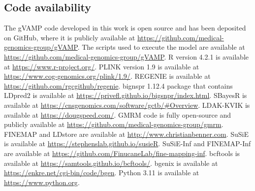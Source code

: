 \subsection{Code availability}
The gVAMP code developed in this work is open source and has been deposited on GitHub, where it is publicly available at \url{https://github.com/medical-genomics-group/gVAMP}. The scripts used to execute the model are available at \url{https://github.com/medical-genomics-group/gVAMP}. R version 4.2.1 is available at \url{https://www.r-project.org/}. PLINK version 1.9 is available at \url{https://www.cog-genomics.org/plink/1.9/}. REGENIE is available at \url{https://github.com/rgcgithub/regenie}. bignspr 1.12.4 package that contains LDpred2 is available at \url{https://privefl.github.io/bigsnpr/index.html}. SBayesR is available at \url{https://cnsgenomics.com/software/gctb/#Overview}. LDAK-KVIK is available at \url{https://dougspeed.com/}. GMRM code is fully open-source and publicly available at \url{https://github.com/medical-genomics-group/gmrm}. FINEMAP and LDstore are available at \url{http://www.christianbenner.com}. SuSiE is available at \url{https://stephenslab.github.io/susieR}. SuSiE-Inf and FINEMAP-Inf are available at \url{https://github.com/FinucaneLab/fine-mapping-inf}. bcftools is available at \url{https://samtools.github.io/bcftools/}. bgenix is available at \url{https://enkre.net/cgi-bin/code/bgen}. Python 3.11 is available at \url{https://www.python.org}. 


